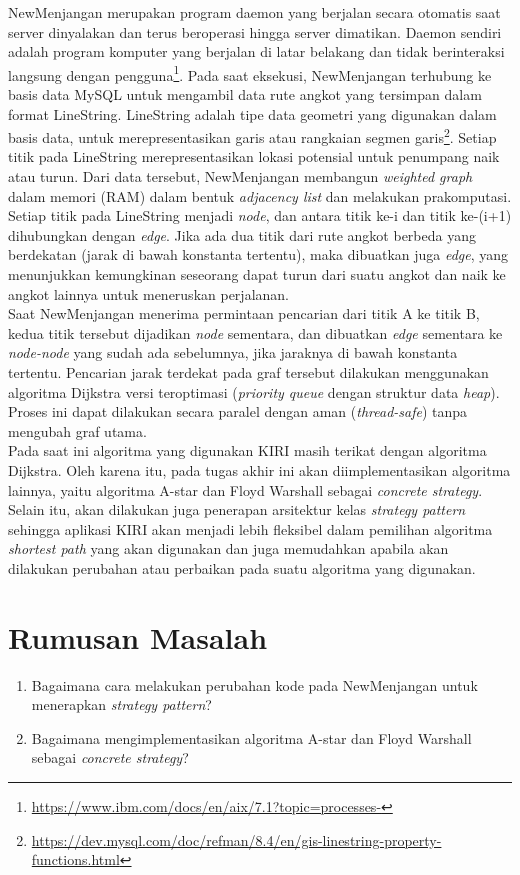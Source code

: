 NewMenjangan merupakan program daemon yang berjalan secara otomatis saat server dinyalakan dan terus beroperasi hingga server dimatikan. Daemon sendiri adalah program komputer yang berjalan di latar belakang dan tidak berinteraksi langsung dengan pengguna\footnote{\url{https://www.ibm.com/docs/en/aix/7.1?topic=processes-}}. Pada saat eksekusi, NewMenjangan terhubung ke basis data MySQL untuk mengambil data rute angkot yang tersimpan dalam format LineString. LineString adalah tipe data geometri yang digunakan dalam basis data, untuk merepresentasikan garis atau rangkaian segmen garis\footnote{\url{https://dev.mysql.com/doc/refman/8.4/en/gis-linestring-property-functions.html}}. Setiap titik pada LineString merepresentasikan lokasi potensial untuk penumpang naik atau turun. Dari data tersebut, NewMenjangan membangun \textit{weighted graph} dalam memori (RAM) dalam bentuk \textit{adjacency list} dan melakukan prakomputasi. Setiap titik pada LineString menjadi \textit{node}, dan antara titik ke-i dan titik ke-(i+1) dihubungkan dengan \textit{edge}. Jika ada dua titik dari rute angkot berbeda yang berdekatan (jarak di bawah konstanta tertentu), maka dibuatkan juga \textit{edge}, yang menunjukkan kemungkinan seseorang dapat turun dari suatu angkot dan naik ke angkot lainnya untuk meneruskan perjalanan. 
\\
Saat NewMenjangan menerima permintaan pencarian dari titik A ke titik B, kedua titik tersebut dijadikan \textit{node} sementara, dan dibuatkan \textit{edge} sementara ke \textit{node-node} yang sudah ada sebelumnya, jika jaraknya di bawah konstanta tertentu. Pencarian jarak terdekat pada graf tersebut dilakukan menggunakan algoritma Dijkstra versi teroptimasi (\textit{priority queue} dengan struktur data \textit{heap}). Proses ini dapat dilakukan secara paralel dengan aman (\textit{thread-safe}) tanpa mengubah graf utama.
\\
Pada saat ini algoritma yang digunakan KIRI masih terikat dengan algoritma Dijkstra. Oleh karena itu, pada tugas akhir ini akan diimplementasikan algoritma lainnya, yaitu algoritma A-star dan Floyd Warshall sebagai \textit{concrete strategy}. Selain itu, akan dilakukan juga penerapan arsitektur kelas \textit{strategy pattern} sehingga aplikasi KIRI akan menjadi lebih fleksibel dalam pemilihan algoritma \textit{shortest path} yang akan digunakan dan juga memudahkan apabila akan dilakukan perubahan atau perbaikan pada suatu algoritma yang digunakan.

\section{Rumusan Masalah}
\label{sec:rumusan}
	\begin{enumerate}
                \item Bagaimana cara melakukan perubahan kode pada NewMenjangan untuk menerapkan \textit{strategy pattern}?
                \item Bagaimana mengimplementasikan algoritma A-star dan Floyd Warshall sebagai \textit{concrete strategy}?
	\end{enumerate}
\newpage
